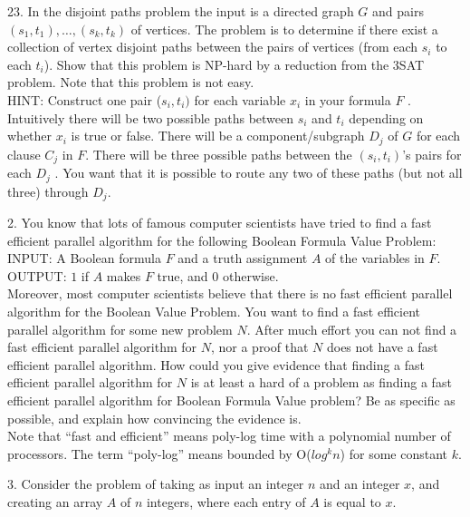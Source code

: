 \documentclass[10pt]{article}
\begin{document}
\newpage

23. In the disjoint paths problem the input is a directed graph $G$ and pairs $(s_1, t_1), \ldots, (s_k, t_k)$ of vertices.
The problem is to determine if there exist a collection of vertex disjoint paths between the pairs of
vertices (from each $s_i$ to each $t_i$). Show that this problem is NP-hard by a reduction from the 3SAT
problem. Note that this problem is not easy.\\
HINT: Construct one pair ($s_i, t_i)$ for each variable $x_i$ in your formula $F$ . Intuitively there will be
two possible paths between $s_i$ and $t_i$ depending on whether $x_i$ is true or false. There will be a
component/subgraph $D_j$ of $G$ for each clause $C_j$ in $F$. There will be three possible paths between the
$(s_i, t_i)$'s pairs for each $D_j$ . You want that it is possible to route any two of these paths (but not all
three) through $D_j$.
\newpage

2. You know that lots of famous computer scientists have tried to find a fast efficient parallel algorithm
for the following Boolean Formula Value Problem:\\
INPUT: A Boolean formula $F$ and a truth assignment $A$ of the variables in $F$.\\
OUTPUT: $1$ if $A$ makes $F$ true, and $0$ otherwise.\\
Moreover, most computer scientists believe that there is no fast efficient parallel algorithm for the
Boolean Value Problem. You want to find a fast efficient parallel algorithm for some new problem $N$.
After much effort you can not find a fast efficient parallel algorithm for $N$, nor a proof that $N$ does
not have a fast efficient parallel algorithm. How could you give evidence that finding a fast efficient
parallel algorithm for $N$ is at least a hard of a problem as finding a fast efficient parallel algorithm for
Boolean Formula Value problem? Be as specific as possible, and explain how convincing the evidence
is.\\
Note that ``fast and efficient'' means poly-log time with a polynomial number of processors. The term
``poly-log'' means bounded by O($log^kn$) for some constant $k$.
\newpage

3. Consider the problem of taking as input an integer $n$ and an integer $x$, and creating an array $A$ of $n$
integers, where each entry of $A$ is equal to $x$.\\
\end{document}
